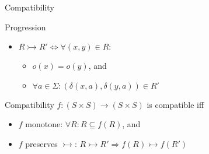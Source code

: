 \documentclass[compress]{beamer}
\begin{document}
\begin{frame}{Compatibility}
  \begin{block}{Progression}
    \begin{itemize}
      \item $R \rightarrowtail R' \iff \forall (x, y) \in R:$\\
        \begin{itemize}
          \item $o(x) = o(y)$, and
          \item $\forall a \in \Sigma: (\delta(x, a), \delta(y, a)) \in R'$
        \end{itemize}
    \end{itemize}
  \end{block}

  \begin{block}{Compatibility}
    $f : (S \times S) \to (S \times S)$ is compatible iff \\
    \begin{itemize}
      \item $f$ monotone: $\forall R: R \subseteq f(R)$, and
      \item $f$ preserves $\rightarrowtail$:
        $R \rightarrowtail R' \Rightarrow f(R) \rightarrowtail f(R')$
    \end{itemize}
  \end{block}
\end{frame}
\end{document}
